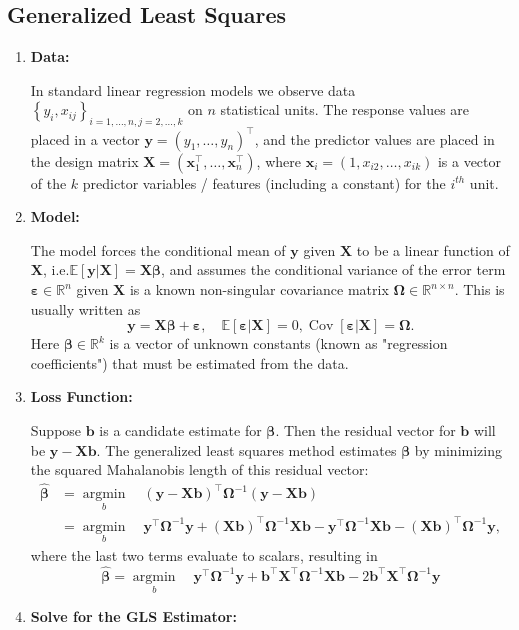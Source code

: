 \documentclass[13pt]{article}
\theoremstyle{definition}
\theoremstyle{remark}
\newcommand{\EE}{\mathbb{E}}
\begin{document}
\subsection{Generalized Least Squares}
\begin{enumerate}
    \item \textbf{Data:} 
    
    In standard linear regression models we observe data $\left\{y_i, x_{i j}\right\}_{i=1, \ldots, n, j=2, \ldots, k}$ on $n$ statistical units. The response values are placed in a vector $\bm{y}=\left(y_1, \ldots, y_n\right)^{\top}$, and the predictor values are placed in the design matrix $\mathbf{X}=\left(\mathbf{x}_1^{\top}, \ldots, \mathbf{x}_n^{\top}\right)$, where $\mathbf{x}_i=\left(1, x_{i 2}, \ldots, x_{i k}\right)$ is a vector of the $k$ predictor variables / features (including a constant) for the $i^{th}$ unit. 
    \item \textbf{Model:} 
    
    The model forces the conditional mean of $\bm{y}$ given $\mathbf{X}$ to be a linear function of $\mathbf{X}$, i.e.$
\mathbb{E}[\bm{y}|\mathbf{X}] = \mathbf{X}\bm{\bm{\beta}}
$, and assumes the conditional variance of the error term $\bm{\varepsilon}\in \mathbb{R}^{n}$ given $\mathbf{X}$ is a known non-singular covariance matrix $\mathbf{\Omega}\in \mathbb{R}^{n\times n}$. This is usually written as
$$
\bm{y}=\mathbf{X} \bm{\bm{\beta}}+\bm{\bm{\varepsilon}}, \quad \EE[\bm{\bm{\varepsilon}} | \mathbf{X}]=0, \operatorname{Cov}[\bm{\bm{\varepsilon}} | \mathbf{X}]=\mathbf{\Omega} .
$$
Here $\bm{\bm{\beta}} \in \mathbb{R}^{k}$ is a vector of unknown constants (known as "regression coefficients") that must be estimated from the data.
\item \textbf{Loss Function:} 

Suppose $\mathbf{b}$ is a candidate estimate for $\bm{\beta}$. Then the residual vector for $\mathbf{b}$ will be $\bm{y}-\mathbf{X b}$. The generalized least squares method estimates $\bm{\beta}$ by minimizing the squared Mahalanobis length of this residual vector:
$$
\begin{aligned}
\hat{\bm{\beta}} & =\underset{b}{\operatorname{argmin}}\quad (\bm{y}-\mathbf{X} \mathbf{b})^{\top} \mathbf{\Omega}^{-1}(\bm{y}-\mathbf{X} \mathbf{b}) \\
& =\underset{b}{\operatorname{argmin}} \quad \bm{y}^{\top} \mathbf{\Omega}^{-1} \bm{y}+(\mathbf{X} \mathbf{b})^{\top} \mathbf{\Omega}^{-1} \mathbf{X} \mathbf{b}-\bm{y}^{\top} \mathbf{\Omega}^{-1} \mathbf{X} \mathbf{b}-(\mathbf{X} \mathbf{b})^{\top} \mathbf{\Omega}^{-1} \bm{y},
\end{aligned}
$$
where the last two terms evaluate to scalars, resulting in
$$
\hat{\bm{\beta}}=\underset{b}{\operatorname{argmin}} \quad \bm{y}^{\top} \mathbf{\Omega}^{-1} \bm{y}+\mathbf{b}^{\top} \mathbf{X}^{\top} \mathbf{\Omega}^{-1} \mathbf{X} \mathbf{b}-2 \mathbf{b}^{\top} \mathbf{X}^{\top} \mathbf{\Omega}^{-1} \bm{y}
$$
\item \textbf{Solve for the GLS Estimator:}


\end{enumerate}
\end{document}
